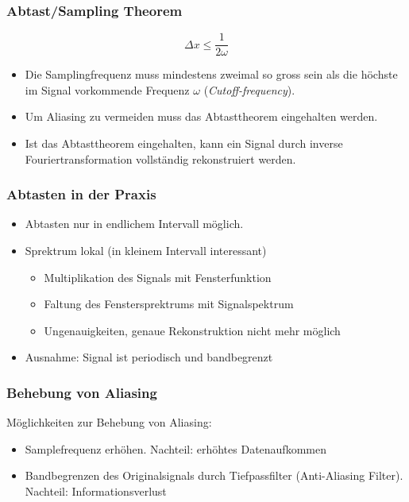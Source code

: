 \subsubsection*{Abtast/Sampling Theorem}
$$\Delta x \leq \frac{1}{2 \omega}$$
\begin{itemize}
\item Die Samplingfrequenz muss mindestens zweimal so gross sein als die höchste im Signal vorkommende Frequenz $\omega$ (\textsl{Cutoff-frequency}).
\item Um Aliasing zu vermeiden muss das Abtasttheorem eingehalten werden.
\item Ist das Abtasttheorem eingehalten, kann ein Signal durch inverse Fouriertransformation vollständig rekonstruiert werden.
\end{itemize}

\subsubsection*{Abtasten in der Praxis}
\begin{itemize}
\item Abtasten nur in endlichem Intervall möglich.
\item Sprektrum lokal (in kleinem Intervall interessant)
\begin{itemize}
\item Multiplikation des Signals mit Fensterfunktion
\item Faltung des Fenstersprektrums mit Signalspektrum
\item Ungenauigkeiten, genaue Rekonstruktion nicht mehr möglich
\end{itemize}
\item Ausnahme: Signal ist periodisch und bandbegrenzt
\end{itemize}

\subsubsection*{Behebung von Aliasing}
Möglichkeiten zur Behebung von Aliasing:
\begin{itemize}
\item Samplefrequenz erhöhen. Nachteil: erhöhtes Datenaufkommen
\item Bandbegrenzen des Originalsignals durch Tiefpassfilter (Anti-Aliasing Filter). Nachteil: Informationsverlust
\end{itemize}

